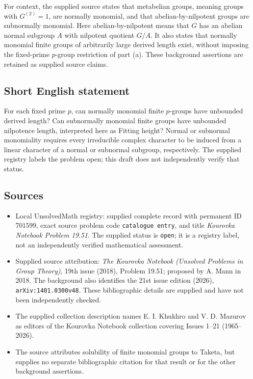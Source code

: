 \documentclass[11pt]{article}
\begin{document}
For context, the supplied source states that metabelian groups, meaning groups with \(G^{(2)}=1\), are normally monomial, and that abelian-by-nilpotent groups are subnormally monomial. Here abelian-by-nilpotent means that \(G\) has an abelian normal subgroup \(A\) with nilpotent quotient \(G/A\). It also states that normally monomial finite groups of arbitrarily large derived length exist, without imposing the fixed-prime \(p\)-group restriction of part (a). These background assertions are retained as supplied source claims.
\subsection{Short English statement}
For each fixed prime \(p\), can normally monomial finite \(p\)-groups have unbounded derived length? Can subnormally monomial finite groups have unbounded nilpotence length, interpreted here as Fitting height? Normal or subnormal monomiality requires every irreducible complex character to be induced from a linear character of a normal or subnormal subgroup, respectively. The supplied registry labels the problem open; this draft does not independently verify that status.
\subsection{Sources}
\begin{itemize}
\item Local UnsolvedMath registry: supplied complete record with permanent ID \(701599\), exact source problem code \texttt{catalogue entry}, and title \emph{Kourovka Notebook Problem 19.51}. The supplied status is \texttt{open}; it is a registry label, not an independently verified mathematical assessment.
\item Supplied source attribution: \emph{The Kourovka Notebook (Unsolved Problems in Group Theory)}, 19th issue (2018), Problem 19.51; proposed by A. Mann in 2018. The background also identifies the 21st issue edition (2026), \texttt{arXiv:1401.0300v48}. These bibliographic details are supplied and have not been independently checked.
\item The supplied collection description names E. I. Khukhro and V. D. Mazurov as editors of the Kourovka Notebook collection covering Issues 1--21 (1965--2026).
\item The source attributes solubility of finite monomial groups to Taketa, but supplies no separate bibliographic citation for that result or for the other background assertions.
\end{itemize}
\end{document}
